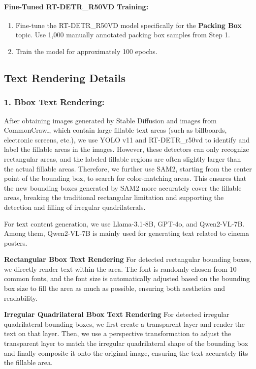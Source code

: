 \paragraph{Fine-Tuned RT-DETR\_R50VD Training:}

\begin{enumerate}
    \item Fine-tune the RT-DETR\_R50VD model specifically for the \textbf{Packing Box} topic. Use 1,000 manually annotated packing box samples from Step 1.
    \item Train the model  for approximately 100 epochs.
\end{enumerate}




\subsection{Text Rendering Details}

\subsubsection{1. Bbox Text Rendering:}
After obtaining images generated by Stable Diffusion and images from CommonCrawl, which contain large fillable text areas (such as billboards, electronic screens, etc.), we use YOLO v11 and RT-DETR\_r50vd to identify and label the fillable areas in the images. However, these detectors can only recognize rectangular areas, and the labeled fillable regions are often slightly larger than the actual fillable areas. 
Therefore, we further use SAM2, starting from the center point of the bounding box, to search for color-matching areas. This ensures that the new bounding boxes generated by SAM2 more accurately cover the fillable areas, breaking the traditional rectangular limitation and supporting the detection and filling of irregular quadrilaterals.

For text content generation, we use Llama-3.1-8B, GPT-4o, and Qwen2-VL-7B. 
Among them, Qwen2-VL-7B is mainly used for generating text related to cinema posters.

\textbf{Rectangular Bbox Text Rendering}
For detected rectangular bounding boxes, we directly render text within the area. 
The font is randomly chosen from 10 common fonts, and the font size is automatically adjusted based on the bounding box size to fill the area as much as possible, ensuring both aesthetics and readability.

\textbf{Irregular Quadrilateral Bbox Text Rendering}
For detected irregular quadrilateral bounding boxes, we first create a transparent layer and render the text on that layer. Then, we use a perspective transformation to adjust the transparent layer to match the irregular quadrilateral shape of the bounding box and finally composite it onto the original image, ensuring the text accurately fits the fillable area.


